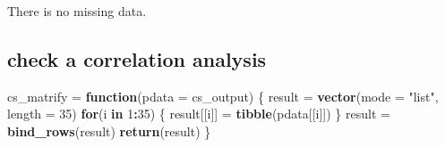 \documentclass[
]{article}
\newenvironment{Shaded}{\begin{snugshade}}{\end{snugshade}}
\newcommand{\ControlFlowTok}[1]{\textcolor[rgb]{0.13,0.29,0.53}{\textbf{#1}}}
\newcommand{\DataTypeTok}[1]{\textcolor[rgb]{0.13,0.29,0.53}{#1}}
\newcommand{\DecValTok}[1]{\textcolor[rgb]{0.00,0.00,0.81}{#1}}
\newcommand{\KeywordTok}[1]{\textcolor[rgb]{0.13,0.29,0.53}{\textbf{#1}}}
\newcommand{\NormalTok}[1]{#1}
\newcommand{\OperatorTok}[1]{\textcolor[rgb]{0.81,0.36,0.00}{\textbf{#1}}}
\newcommand{\StringTok}[1]{\textcolor[rgb]{0.31,0.60,0.02}{#1}}
\begin{document}
There is no missing data.

\hypertarget{check-a-correlation-analysis}{%
\subsection{check a correlation
analysis}\label{check-a-correlation-analysis}}

\begin{Shaded}
\begin{Highlighting}[]
\NormalTok{cs_matrify =}\StringTok{ }\ControlFlowTok{function}\NormalTok{(}\DataTypeTok{pdata =}\NormalTok{ cs_output) \{}
\NormalTok{  result =}\StringTok{ }\KeywordTok{vector}\NormalTok{(}\DataTypeTok{mode =} \StringTok{"list"}\NormalTok{, }\DataTypeTok{length =} \DecValTok{35}\NormalTok{)}
  \ControlFlowTok{for}\NormalTok{(i }\ControlFlowTok{in} \DecValTok{1}\OperatorTok{:}\DecValTok{35}\NormalTok{) \{}
\NormalTok{      result[[i]] =}\StringTok{ }\KeywordTok{tibble}\NormalTok{(pdata[[i]])}
\NormalTok{  \}}
\NormalTok{  result =}\StringTok{ }\KeywordTok{bind_rows}\NormalTok{(result)}
  \KeywordTok{return}\NormalTok{(result)}
\NormalTok{\}}
\end{Highlighting}
\end{Shaded}
\end{document}
